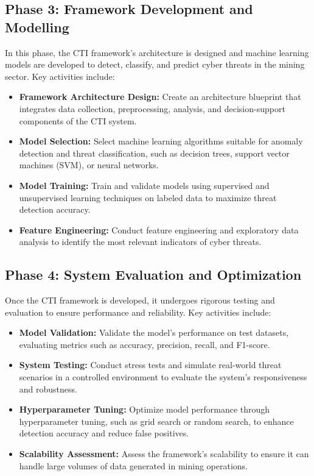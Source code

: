 \documentclass[a4paper,twoside,12pt]{report}
\begin{document}
\subsection{Phase 3: Framework Development and Modelling}
In this phase, the CTI framework’s architecture is designed and machine learning models are developed to detect, classify, and predict cyber threats in the mining sector. Key activities include:
\begin{itemize}
    \item \textbf{Framework Architecture Design:} Create an architecture blueprint that integrates data collection, preprocessing, analysis, and decision-support components of the CTI system.
    \item \textbf{Model Selection:} Select machine learning algorithms suitable for anomaly detection and threat classification, such as decision trees, support vector machines (SVM), or neural networks.
    \item \textbf{Model Training:} Train and validate models using supervised and unsupervised learning techniques on labeled data to maximize threat detection accuracy.
    \item \textbf{Feature Engineering:} Conduct feature engineering and exploratory data analysis to identify the most relevant indicators of cyber threats.
\end{itemize}

\subsection{Phase 4: System Evaluation and Optimization}
Once the CTI framework is developed, it undergoes rigorous testing and evaluation to ensure performance and reliability. Key activities include:
\begin{itemize}
    \item \textbf{Model Validation:} Validate the model’s performance on test datasets, evaluating metrics such as accuracy, precision, recall, and F1-score.
    \item \textbf{System Testing:} Conduct stress tests and simulate real-world threat scenarios in a controlled environment to evaluate the system’s responsiveness and robustness.
    \item \textbf{Hyperparameter Tuning:} Optimize model performance through hyperparameter tuning, such as grid search or random search, to enhance detection accuracy and reduce false positives.
    \item \textbf{Scalability Assessment:} Assess the framework’s scalability to ensure it can handle large volumes of data generated in mining operations.
\end{itemize}
\end{document}

